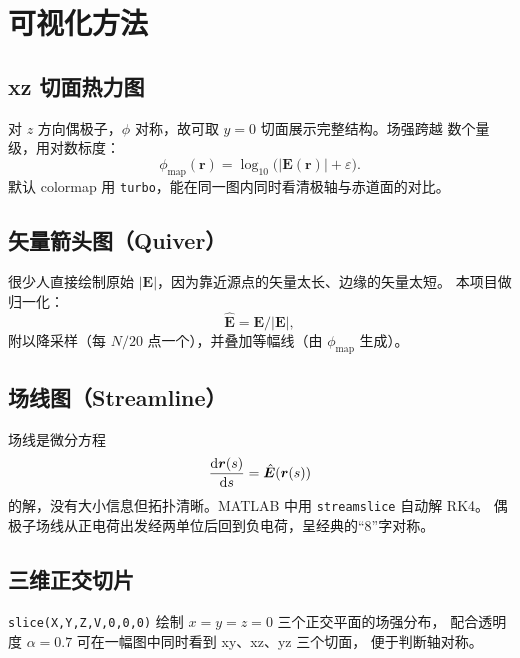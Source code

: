 \documentclass[11pt,a4paper]{article}
\newcommand{\eps}{\varepsilon}
\newcommand{\Evec}{\bm E}
\newcommand{\rvec}{\bm r}
\begin{document}
\section{可视化方法}

\subsection{xz 切面热力图}
对 $z$ 方向偶极子，$\phi$ 对称，故可取 $y=0$ 切面展示完整结构。场强跨越
数个量级，用对数标度：
\begin{equation}
    \phi_{\text{map}}(\rvec)=\log_{10}\bigl(|\Evec(\rvec)|+\eps\bigr).
\end{equation}
默认 colormap 用 \texttt{turbo}，能在同一图内同时看清极轴与赤道面的对比。

\subsection{矢量箭头图（Quiver）}
很少人直接绘制原始 $|\Evec|$，因为靠近源点的矢量太长、边缘的矢量太短。
本项目做归一化：
\begin{equation}
    \hat{\Evec} = \Evec/|\Evec|,
\end{equation}
附以降采样（每 $N/20$ 点一个），并叠加等幅线（由 $\phi_{\text{map}}$ 生成）。

\subsection{场线图（Streamline）}
场线是微分方程
\begin{equation}
    \dv{\rvec(s)}{s} = \hat{\Evec}(\rvec(s))
\end{equation}
的解，没有大小信息但拓扑清晰。MATLAB 中用 \verb|streamslice| 自动解 RK4。
偶极子场线从正电荷出发经两单位后回到负电荷，呈经典的“8”字对称。

\subsection{三维正交切片}
\verb|slice(X,Y,Z,V,0,0,0)| 绘制 $x=y=z=0$ 三个正交平面的场强分布，
配合透明度 $\alpha=0.7$ 可在一幅图中同时看到 xy、xz、yz 三个切面，
便于判断轴对称。
\end{document}
